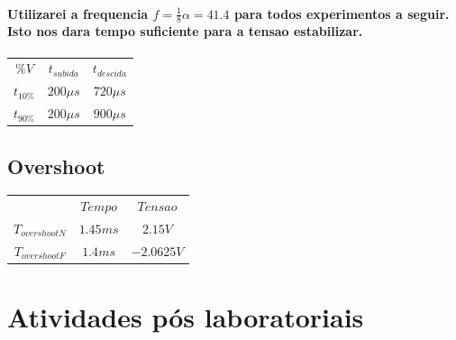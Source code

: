 \documentclass[12pt,twoside, a4paper, twocolumn]{article}
\begin{document}
\paragraph*{Utilizarei a frequencia $f = \frac{1}{8} \alpha = 41.4$ para todos experimentos a seguir. Isto nos dara tempo suficiente para a tensao estabilizar.}

\begin{center}
    \begin{tabular}{ |ccc| }
        \hline
        $\%V$      & $t_{subida}$ & $t_{descida}$ \\
        $t_{10\%}$ & $200\mu s$   & $720 \mu s$   \\
        $t_{90\%}$ & $200\mu s$   & $900 \mu s$   \\
        \hline
    \end{tabular}
\end{center}

\subsection{Overshoot}

\begin{center}
    \begin{tabular}{ |ccc| }
        \hline
        $\,$             & $Tempo$  & $Tensao$   \\
        $T_{overshootN}$ & $1.45ms$ & $2.15V$    \\
        $T_{overshootF}$ & $1.4ms$  & $-2.0625V$ \\
        \hline
    \end{tabular}
\end{center}

\newpage
\section{Atividades pós laboratoriais}
\end{document}
